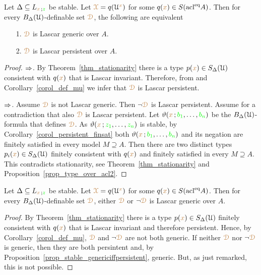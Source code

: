\begin{proposition}\label{prop_stable_genericiffpersistent}
  Let $\Delta\subseteq L_{{\color{brown} x}\,;{\color{green} z}}$ be stable.
  Let ${\color{brown}\EuScript X}=q(\EuScript U^{\color{brown} x})$ for some $q({\color{brown} x})\in S(\mathop{\rm acl}^{{\rm eq}}\!A)$.
  Then for every $B_\Delta(\EuScript U)$-definable set ${\color{brown}\EuScript D}$, the following are equivalent
  \begin{itemize}
    \item[1.] ${\color{brown}\EuScript D}$ is Lascar generic over $A$.
    \item[2.] ${\color{brown}\EuScript D}$ is Lascar persistent over $A$.
  \end{itemize}
\end{proposition}

\begin{proof}
  $\Rightarrow$.
  By Theorem~\ref{thm_stationarity} there is a type $p({\color{brown} x})\in S_\Delta(\EuScript U)$ consistent with $q({\color{brown} x})$ that is Lascar invariant.
  Therefore, from  and Corollary~\ref{corol_def_mu} we infer that ${\color{brown}\EuScript D}$ is Lascar persistent.

  $\Rightarrow$.
  Assume ${\color{brown}\EuScript D}$ is not Lascar generic.
  Then $\neg{\color{brown}\EuScript D}$ is Lascar persistent.
  Assume for a contradiction that also ${\color{brown}\EuScript D}$ is Lascar persistent.
  Let $\vartheta({\color{brown} x}\,;{\color{green} b_1},\dots,{\color{green} b_n})$ be the $B_\Delta(\EuScript U)$-formula that defines ${\color{brown}\EuScript D}$.
  As $\vartheta({\color{brown} x}\,;{\color{green} z_1},\dots,{\color{green} z_n})$ is stable, by Corollary~\ref{corol_persistent_finsat} both $\vartheta({\color{brown} x}\,;{\color{green} b_1},\dots,{\color{green} b_n})$ and its negation are finitely satisfied in every model $M\supseteq A$.
  Then there are two distinct types $p_i({\color{brown} x})\in S_\Delta(\EuScript U)$ finitely consistent with $q({\color{brown} x})$ and finitely satisfied in every $M\supseteq A$.
  This contradicts stationarity, see Theorem~\ref{thm_stationarity} and Proposition~\ref{prop_type_over_acl2}.
\end{proof}

\begin{corollary}\label{corol_stable_generic}
  Let $\Delta\subseteq L_{{\color{brown} x}\,;{\color{green} z}}$ be stable.
  Let ${\color{brown}\EuScript X}=q(\EuScript U^{\color{brown} x})$ for some $q({\color{brown} x})\in S(\mathop{\rm acl}^{{\rm eq}}\!A)$.
  Then for every $B_\Delta(\EuScript U)$-definable set ${\color{brown}\EuScript D}$, either ${\color{brown}\EuScript D}$ or $\neg{\color{brown}\EuScript D}$ is Lascar generic over $A$.
\end{corollary}

\begin{proof}
  By Theorem~\ref{thm_stationarity} there is a type $p({\color{brown} x})\in S_\Delta(\EuScript U)$ finitely consistent with $q({\color{brown} x})$ that is Lascar invariant and therefore persistent.
  Hence, by Corollary~\ref{corol_def_mu}, ${\color{brown}\EuScript D}$ and $\neg{\color{brown}\EuScript D}$ are not both generic.
  If neither ${\color{brown}\EuScript D}$ nor $\neg{\color{brown}\EuScript D}$ is generic, then they are both persintent and, by Proposition~\ref{prop_stable_genericiffpersistent}, generic.
  But, as just remarked, this is not possible.
\end{proof}


